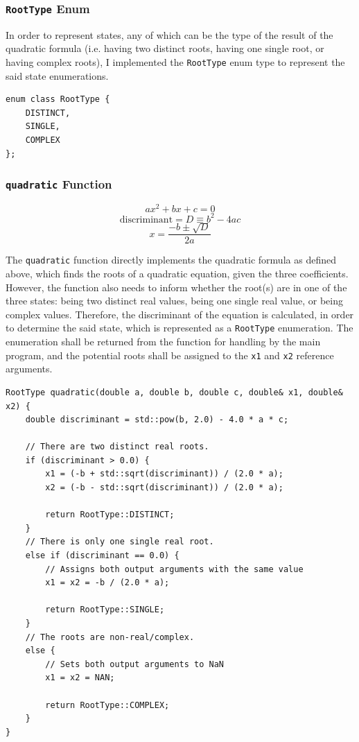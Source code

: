 \documentclass[12pt]{article}
\begin{document}
\subsubsection{\texttt{RootType} Enum}

In order to represent states, any of which can be the type of the result of the quadratic formula (i.e. having two distinct roots, having one single root, or having complex roots), I implemented the \texttt{RootType} enum type to represent the said state enumerations.

\begin{verbatim}
enum class RootType {
    DISTINCT,
    SINGLE,
    COMPLEX
};
\end{verbatim}

\subsubsection{\texttt{quadratic} Function}

$$ax^2 + bx + c = 0$$
$$\text{discriminant} = D \equiv b^2 - 4ac$$
$$x = \frac{-b \pm \sqrt{D}}{2a}$$

The \texttt{quadratic} function directly implements the quadratic formula as defined above, which finds the roots of a quadratic equation, given the three coefficients. However, the function also needs to inform whether the root(s) are in one of the three states: being two distinct real values, being one single real value, or being complex values. Therefore, the discriminant of the equation is calculated, in order to determine the said state, which is represented as a \texttt{RootType} enumeration. The enumeration shall be returned from the function for handling by the main program, and the potential roots shall be assigned to the \texttt{x1} and \texttt{x2} reference arguments.

\begin{verbatim}
RootType quadratic(double a, double b, double c, double& x1, double& x2) {
    double discriminant = std::pow(b, 2.0) - 4.0 * a * c;

    // There are two distinct real roots.
    if (discriminant > 0.0) {
        x1 = (-b + std::sqrt(discriminant)) / (2.0 * a);
        x2 = (-b - std::sqrt(discriminant)) / (2.0 * a);

        return RootType::DISTINCT;
    }
    // There is only one single real root.
    else if (discriminant == 0.0) {
        // Assigns both output arguments with the same value
        x1 = x2 = -b / (2.0 * a);

        return RootType::SINGLE;
    }
    // The roots are non-real/complex.
    else {
        // Sets both output arguments to NaN
        x1 = x2 = NAN;

        return RootType::COMPLEX;
    }
}
\end{verbatim}
\end{document}
